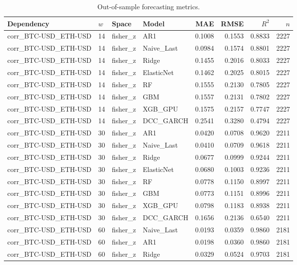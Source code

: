 \begin{table}[H]
\centering
\small
\caption{Out-of-sample forecasting metrics.}
\label{tab:metrics}
\begin{tabular}{llllrrrr}
\toprule
Dependency & $w$ & Space & Model & MAE & RMSE & $R^2$ & $n$ \\
\midrule
corr_BTC-USD_ETH-USD & 14 & fisher_z & AR1 & 0.1008 & 0.1553 & 0.8833 & 2227 \\
corr_BTC-USD_ETH-USD & 14 & fisher_z & Naive_Last & 0.0984 & 0.1574 & 0.8801 & 2227 \\
corr_BTC-USD_ETH-USD & 14 & fisher_z & Ridge & 0.1455 & 0.2016 & 0.8033 & 2227 \\
corr_BTC-USD_ETH-USD & 14 & fisher_z & ElasticNet & 0.1462 & 0.2025 & 0.8015 & 2227 \\
corr_BTC-USD_ETH-USD & 14 & fisher_z & RF & 0.1555 & 0.2130 & 0.7805 & 2227 \\
corr_BTC-USD_ETH-USD & 14 & fisher_z & GBM & 0.1557 & 0.2131 & 0.7802 & 2227 \\
corr_BTC-USD_ETH-USD & 14 & fisher_z & XGB_GPU & 0.1575 & 0.2157 & 0.7747 & 2227 \\
corr_BTC-USD_ETH-USD & 14 & fisher_z & DCC_GARCH & 0.2541 & 0.3280 & 0.4794 & 2227 \\
corr_BTC-USD_ETH-USD & 30 & fisher_z & AR1 & 0.0420 & 0.0708 & 0.9620 & 2211 \\
corr_BTC-USD_ETH-USD & 30 & fisher_z & Naive_Last & 0.0410 & 0.0709 & 0.9618 & 2211 \\
corr_BTC-USD_ETH-USD & 30 & fisher_z & Ridge & 0.0677 & 0.0999 & 0.9244 & 2211 \\
corr_BTC-USD_ETH-USD & 30 & fisher_z & ElasticNet & 0.0680 & 0.1003 & 0.9236 & 2211 \\
corr_BTC-USD_ETH-USD & 30 & fisher_z & RF & 0.0778 & 0.1150 & 0.8997 & 2211 \\
corr_BTC-USD_ETH-USD & 30 & fisher_z & GBM & 0.0773 & 0.1151 & 0.8996 & 2211 \\
corr_BTC-USD_ETH-USD & 30 & fisher_z & XGB_GPU & 0.0798 & 0.1183 & 0.8938 & 2211 \\
corr_BTC-USD_ETH-USD & 30 & fisher_z & DCC_GARCH & 0.1656 & 0.2136 & 0.6540 & 2211 \\
corr_BTC-USD_ETH-USD & 60 & fisher_z & Naive_Last & 0.0193 & 0.0359 & 0.9860 & 2181 \\
corr_BTC-USD_ETH-USD & 60 & fisher_z & AR1 & 0.0198 & 0.0360 & 0.9860 & 2181 \\
corr_BTC-USD_ETH-USD & 60 & fisher_z & Ridge & 0.0329 & 0.0524 & 0.9703 & 2181 \\

\end{tabular}
\end{table}
